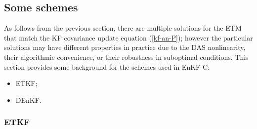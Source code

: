 \documentclass[11pt]{report}
\begin{document}
\subsection{Some schemes}

As follows from the previous section, there are multiple solutions for the ETM that match the KF covariance update equation (\ref{kf-an-P}); however the particular solutions may have different properties in practice due to the DAS nonlinearity, their algorithmic convenience, or their robustness in suboptimal conditions.
This section provides some background for the schemes used in EnKF-C:
\begin{itemize}
\item ETKF;
\item DEnKF.
\end{itemize}

\subsubsection{ETKF}
\end{document}
